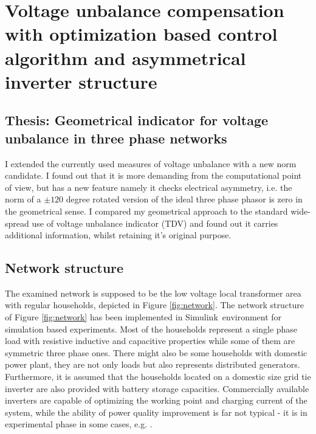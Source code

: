 \chapter{Voltage unbalance compensation with optimization based control algorithm and asymmetrical inverter structure}

\section{Thesis: Geometrical indicator for voltage unbalance in three phase networks}
    I extended the currently used measures of voltage unbalance with a new norm candidate. I found out that it is more demanding from the computational point of view, but has a new feature namely it checks electrical asymmetry, i.e. the norm of a $\pm120$ degree rotated version of the ideal three phase phasor is zero in the geometrical sense. I compared my geometrical approach to the standard wide-spread use of voltage unbalance indicator (TDV) and found out it carries additional information, whilst retaining it's original purpose.
		
\section{Network structure}

         The examined network is supposed to be the low voltage local transformer area with regular households, depicted in Figure \ref{fig:network}. The network structure of Figure \ref{fig:network} has been implemented in Simulink\texttrademark\, environment for simulation based experiments. Most of the households represent a single phase load with resistive inductive and capacitive properties while some of them are symmetric three phase ones. There might also be some households with domestic power plant, they are not only loads but also
         represents distributed generators. Furthermore, it is assumed that the households located on a domestic size grid tie inverter are also provided with battery storage capacities. Commercially available inverters are capable of optimizing the working point and charging current of the system, while the ability of power quality improvement is far not typical - it is in experimental phase in some cases, e.g. \cite{gorbe2012reduction}.%

